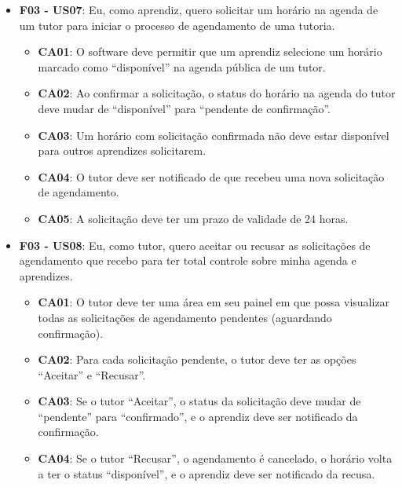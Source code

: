 \begin{itemize}
\begin{itemize}
\end{itemize}

\item \textbf{F03 - US07}: Eu, como aprendiz, quero solicitar um horário na agenda de um tutor para iniciar o processo de agendamento de uma tutoria.

\begin{itemize}

\item \textbf{CA01}: O software deve permitir que um aprendiz selecione um horário marcado como ``disponível'' na agenda pública de um tutor.

\item \textbf{CA02}: Ao confirmar a solicitação, o status do horário na agenda do tutor deve mudar de ``disponível'' para ``pendente de confirmação''.

\item \textbf{CA03}: Um horário com solicitação confirmada não deve estar disponível para outros aprendizes solicitarem.

\item \textbf{CA04}: O tutor deve ser notificado de que recebeu uma nova solicitação de agendamento.

\item \textbf{CA05}: A solicitação deve ter um prazo de validade de 24 horas.

\end{itemize}

\item \textbf{F03 - US08}: Eu, como tutor, quero aceitar ou recusar as solicitações de agendamento que recebo para ter total controle sobre minha agenda e aprendizes.

\begin{itemize}

\item \textbf{CA01}: O tutor deve ter uma área em seu painel em que possa visualizar todas as solicitações de agendamento pendentes (aguardando confirmação).

\item \textbf{CA02}: Para cada solicitação pendente, o tutor deve ter as opções ``Aceitar'' e ``Recusar''.

\item \textbf{CA03}: Se o tutor ``Aceitar'', o status da solicitação deve mudar de ``pendente'' para ``confirmado'', e o aprendiz deve ser notificado da confirmação.

\item \textbf{CA04}: Se o tutor ``Recusar'', o agendamento é cancelado, o horário volta a ter o status ``disponível'', e o aprendiz deve ser notificado da recusa.


\end{itemize}
\end{itemize}
